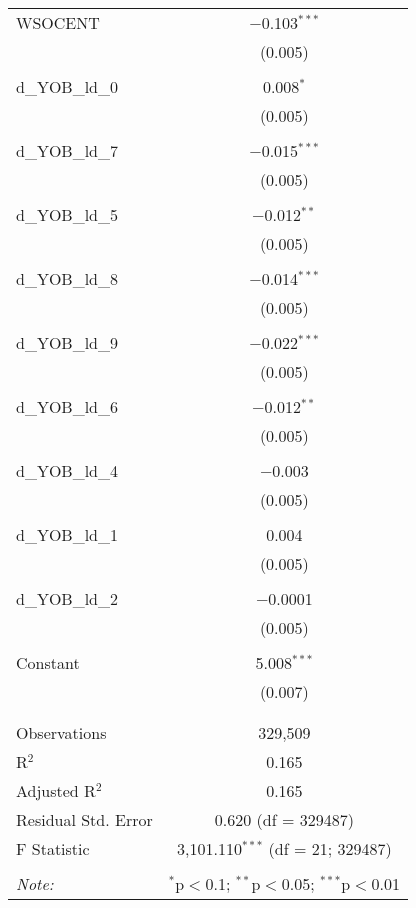 \begin{table}[!htbp]
\begin{tabular}{@{\extracolsep{5pt}}lc}
 WSOCENT & $-$0.103$^{***}$ \\ 
  & (0.005) \\ 
  & \\ 
 d\_YOB\_ld\_0 & 0.008$^{*}$ \\ 
  & (0.005) \\ 
  & \\ 
 d\_YOB\_ld\_7 & $-$0.015$^{***}$ \\ 
  & (0.005) \\ 
  & \\ 
 d\_YOB\_ld\_5 & $-$0.012$^{**}$ \\ 
  & (0.005) \\ 
  & \\ 
 d\_YOB\_ld\_8 & $-$0.014$^{***}$ \\ 
  & (0.005) \\ 
  & \\ 
 d\_YOB\_ld\_9 & $-$0.022$^{***}$ \\ 
  & (0.005) \\ 
  & \\ 
 d\_YOB\_ld\_6 & $-$0.012$^{**}$ \\ 
  & (0.005) \\ 
  & \\ 
 d\_YOB\_ld\_4 & $-$0.003 \\ 
  & (0.005) \\ 
  & \\ 
 d\_YOB\_ld\_1 & 0.004 \\ 
  & (0.005) \\ 
  & \\ 
 d\_YOB\_ld\_2 & $-$0.0001 \\ 
  & (0.005) \\ 
  & \\ 
 Constant & 5.008$^{***}$ \\ 
  & (0.007) \\ 
  & \\ 
\hline \\[-1.8ex] 
Observations & 329,509 \\ 
R$^{2}$ & 0.165 \\ 
Adjusted R$^{2}$ & 0.165 \\ 
Residual Std. Error & 0.620 (df = 329487) \\ 
F Statistic & 3,101.110$^{***}$ (df = 21; 329487) \\ 
\hline 
\hline \\[-1.8ex] 
\textit{Note:}  & \multicolumn{1}{r}{$^{*}$p$<$0.1; $^{**}$p$<$0.05; $^{***}$p$<$0.01} \\ 
\end{tabular} 
\end{table} 
